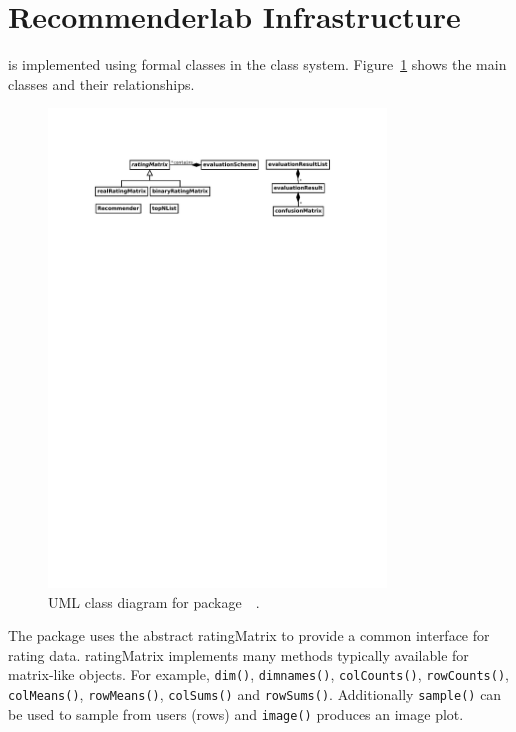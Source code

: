 \documentclass[nojss]{jss}
\newcommand{\class}[1]{\mbox{\textsf{#1}}}
\newcommand{\func}[1]{\mbox{\texttt{#1()}}}
\begin{document}
\section{Recommenderlab Infrastructure}
\label{sec:infrastructure}
 is implemented using formal classes in
the  class system.
Figure~\ref{fig:class_diagram} shows the main classes and their relationships.

\begin{figure}
\centerline{\includegraphics[width=0.8\textwidth]{recommenderlab_classes}}
\caption{UML class diagram for
package~~\citep{misc:Fowler:2004}.}
\label{fig:class_diagram}
\end{figure}

The package uses the abstract \class{ratingMatrix}
to provide a common interface for rating data. \class{ratingMatrix}
implements many methods typically available for matrix-like
objects. For example, \func{dim}, \func{dimnames},
\func{colCounts}, \func{rowCounts},
\func{colMeans}, \func{rowMeans},
\func{colSums} and \func{rowSums}.
Additionally \func{sample} can be used to sample from users (rows) and
\func{image} produces an image plot.
\end{document}
